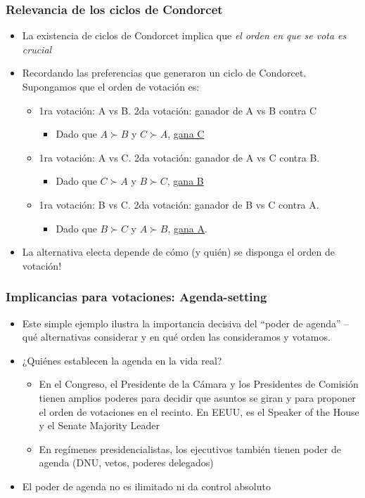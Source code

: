 \documentclass[14pt,aspectratio=169]{beamer}
\begin{document}
\begin{frame}\frametitle{Relevancia de los ciclos de Condorcet}
\begin{itemize}
\item La existencia de ciclos de Condorcet implica que \textit{el
    orden en que se vota es crucial}
\item Recordando las preferencias que generaron un ciclo de
  Condorcet. Supongamos que el orden de votación es:
\begin{itemize}\itemsep 5pt \smallskip
\item 1ra votación: A vs B. 2da votación: ganador de A vs B
  contra C
\begin{itemize}\itemsep 5pt \smallskip
\item Dado que $A \succ B$ y $C \succ A$, \underline{gana C}
\end{itemize}
\item 1ra votación: A vs C. 2da votación: ganador de A vs C
  contra B.
\begin{itemize}\itemsep 5pt \smallskip
\item Dado que $C \succ A$ y $B \succ C$, \underline{gana B}
\end{itemize}
\item 1ra votación: B vs C. 2da votación: ganador de B vs C contra A.
\begin{itemize}\itemsep 5pt \smallskip
\item Dado que $B \succ C$ y $A \succ B$, \underline{gana A}.
\end{itemize}
\end{itemize}
\item La alternativa electa depende de cómo (y quién) se disponga el orden de votación!
\end{itemize}
\end{frame}

\begin{frame}\frametitle{Implicancias para votaciones: Agenda-setting}
\begin{itemize}
\item Este simple ejemplo ilustra la importancia decisiva del ``poder de
  agenda'' --qué alternativas considerar y en qué orden las
  consideramos y votamos.
\item ¿Quiénes establecen la agenda en la vida real?
\begin{itemize}\itemsep 5pt \medskip
\item En el Congreso, el Presidente de la Cámara y los Presidentes de
  Comisión tienen amplios poderes para decidir que asuntos se giran y
  para proponer el orden de votaciones en el recinto. En EEUU, es el
  Speaker of the House y el Senate Majority Leader
\item En regímenes presidencialistas, los ejecutivos también tienen
  poder de agenda (DNU, vetos, poderes delegados)
\end{itemize}
\item El poder de agenda no es ilimitado ni da control absoluto
\end{itemize}
\end{frame}
\end{document}
